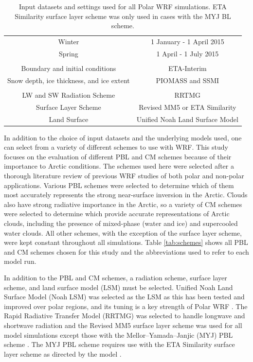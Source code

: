 \begin{table}[h]
\centering
\footnotesize
\doublespacing
{
\begin{tabular}{| c | c |}
\hline
\rowcolor[HTML]{F3F3F3} \multicolumn{2}{|c|}{\textbf{Dates}} \\
\hline
Winter & 1 January - 1 April 2015 \\
Spring & 1 April - 1 July 2015 \\
\hline
 \rowcolor[HTML]{F3F3F3} \multicolumn{2}{|c|}{\textbf{Input Datasets}} \\
\hline
 Boundary and initial conditions & ETA-Interim \\
 Snow depth, ice thickness, and ice extent & PIOMASS and SSMI \\
\hline
\rowcolor[HTML]{F3F3F3} \multicolumn{2}{|c|}{\textbf{Polar WRF Settings}} \\
\hline
 LW and SW Radiation Scheme & RRTMG \\ 
 Surface Layer Scheme & Revised MM5 or ETA Similarity \\
 Land Surface & Unified Noah Land Surface Model  \\ 
  \hline
\end{tabular}}
\caption{Input datasets and settings used for all Polar WRF simulations. ETA Similarity surface layer scheme was only used in cases with the MYJ BL scheme.}
\label{tab:setup}
\end{table}

In addition to the choice of input datasets and the underlying models used, one can select from a variety of different schemes to use with WRF. This study focuses on the evaluation of different PBL and CM schemes because of their importance to Arctic conditions. The schemes used here were selected after a thorough literature review of previous WRF studies of both polar and non-polar applications. Various PBL schemes were selected to determine which of them most accurately represents the strong near-surface inversion in the Arctic. Clouds also have strong radiative importance in the Arctic, so a variety of CM schemes were selected to determine which provide accurate representations of Arctic clouds, including the presence of mixed-phase (water and ice) and supercooled water clouds. All other schemes, with the exception of the surface layer scheme, were kept constant throughout all simulations. Table \ref{tab:schemes} shows all PBL and CM schemes chosen for this study and the abbreviations used to refer to each model run. 

In addition to the PBL and CM schemes, a radiation scheme, surface layer scheme, and land surface model (LSM) must be selected. Unified Noah Land Surface Model (Noah LSM) was selected as the LSM as this has been tested and improved over polar regions, and its tuning is a key strength of Polar WRF \citep{mukul:2004, hines:2015, tewari:2004}. The Rapid Radiative Transfer Model (RRTMG) was selected to handle longwave and shortwave radiation \cite{mlawer:1997} and the Revised MM5 surface layer scheme was used for all model simulations except those with the Mellor–Yamada–Janjic (MYJ) PBL scheme \citep{jimenez:2012}. The MYJ PBL scheme requires use with the ETA Similarity surface layer scheme as directed by the model \citep{janjic:2001}. 

